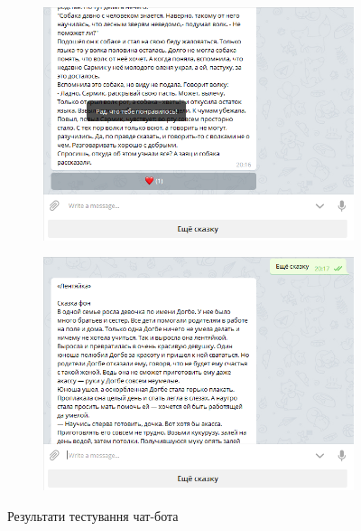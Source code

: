 \documentclass[
	a4paper,
	oneside,
	BCOR = 10mm,
	DIV = 12,
	12pt,
	headings = normal,
]{scrartcl}
\begin{document}
\begin{figure}[!htbp]
\begin{subfigure}[t]{0.5\baselineskip}
					\caption{}
					\label{subfig:test-02}
				\end{subfigure}
				\begin{subfigure}[t]{0.5\baselineskip}
					\centering
					\includegraphics[width=\columnwidth]{./assets/y03s02-practice-01-report-p03.png}
					\caption{}
					\label{subfig:test-03}
				\end{subfigure}%
				\hspace{\baselineskip}%
				\begin{subfigure}[t]{0.5\baselineskip}
					\centering
					\includegraphics[width=\columnwidth]{./assets/y03s02-practice-01-report-p04.png}
					\caption{}
					\label{subfig:test-04}
				\end{subfigure}%
				\caption{Результати тестування чат-бота}
				\label{fig:test}
			\end{figure}
\end{document}
